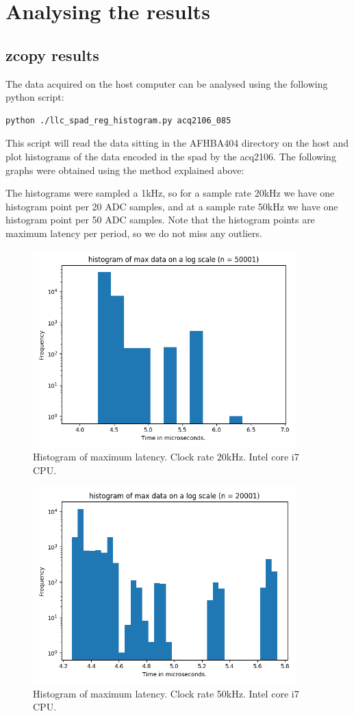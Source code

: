 \documentclass{article}
\begin{document}
\section{Analysing the results}
\subsection{zcopy results}
The data acquired on the host computer can be analysed using the following python script:

\begin{verbatim}
python ./llc_spad_reg_histogram.py acq2106_085
\end{verbatim}

This script will read the data sitting in the AFHBA404 directory on the host and plot histograms of the data encoded in the spad by the acq2106.
The following graphs were obtained using the method explained above:

The histograms were sampled a 1kHz, so for a sample rate 20kHz we have one histogram point per 20 ADC samples, and at a sample rate 50kHz we have one histogram point per 50 ADC samples.
Note that the histogram points are maximum latency per period, so we do not miss any outliers.

\begin{figure}
	\centering
	\includegraphics[width=4.0in]{images/zcopy_20kHz.png}
	\caption{Histogram of maximum latency. Clock rate 20kHz. Intel core i7 CPU.}
	\label{}
\end{figure}

\begin{figure}
	\centering
	\includegraphics[width=4.0in]{images/zcopy_50kHz.png}
	\caption{Histogram of maximum latency. Clock rate 50kHz. Intel core i7 CPU.}
	\label{}
\end{figure}
\end{document}
